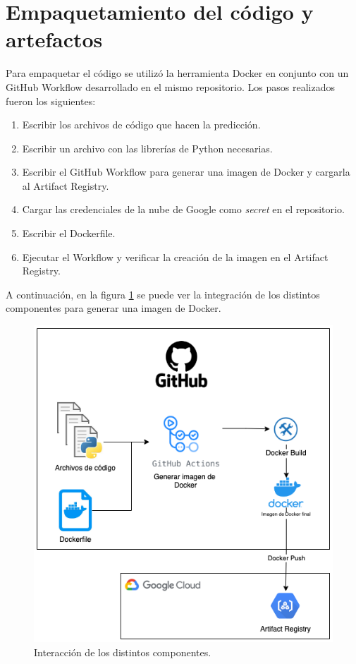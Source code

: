 
\section{Empaquetamiento del código y artefactos}

Para empaquetar el código se utilizó la herramienta Docker en conjunto con un GitHub Workflow desarrollado en el mismo repositorio. Los pasos realizados fueron los siguientes:
\begin{enumerate}
	\item Escribir los archivos de código que hacen la predicción.
	\item Escribir un archivo con las librerías de Python necesarias.
	\item Escribir el GitHub Workflow para generar una imagen de Docker y cargarla al Artifact Registry.
	\item Cargar las credenciales de la nube de Google como \textit{secret} en el repositorio.
	\item Escribir el Dockerfile.
	\item Ejecutar el Workflow y verificar la creación de la imagen en el Artifact Registry.
\end{enumerate}

A continuación, en la figura \ref{fig:cap3-docker-integracion} se puede ver la integración de los distintos componentes para generar una imagen de Docker.

\begin{figure}[htbp]
	\centering
	\includegraphics[width=.6\textwidth]{./Figures/cap3-docker-integracion.png}
	\caption{Interacción de los distintos componentes.}
	\label{fig:cap3-docker-integracion}
\end{figure}

